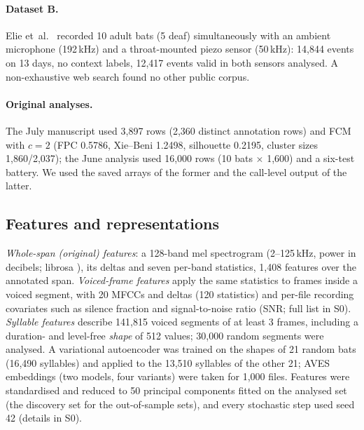 \paragraph{Dataset B.} Elie et~al.\ \cite{elie2024} recorded 10 adult bats (5 deaf) simultaneously with an ambient microphone (192\,kHz) and a throat-mounted piezo sensor (50\,kHz): 14,844 events on 13 days, no context labels, 12,417 events valid in both sensors analysed. A non-exhaustive web search found no other public corpus.

\paragraph{Original analyses.} The July manuscript used 3,897 rows (2,360 distinct annotation rows) and FCM with $c=2$ (FPC 0.5786, Xie--Beni 1.2498, silhouette 0.2195, cluster sizes 1,860/2,037); the June analysis used 16,000 rows (10 bats $\times$ 1,600) and a six-test battery. We used the saved arrays of the former and the call-level output of the latter.

\subsection{Features and representations}
\emph{Whole-span (original) features}: a 128-band mel spectrogram (2--125\,kHz, power in decibels; librosa \cite{mcfee2015}), its deltas and seven per-band statistics, 1,408 features over the annotated span. \emph{Voiced-frame features} apply the same statistics to frames inside a voiced segment, with 20 MFCCs and deltas (120 statistics) and per-file recording covariates such as silence fraction and signal-to-noise ratio (SNR; full list in S0). \emph{Syllable features} describe 141,815 voiced segments of at least 3 frames, including a duration- and level-free \emph{shape} of 512 values; 30,000 random segments were analysed. A variational autoencoder \cite{goffinet2021} was trained on the shapes of 21 random bats (16,490 syllables) and applied to the 13,510 syllables of the other 21; AVES embeddings \cite{aves2023} (two models, four variants) were taken for 1,000 files. Features were standardised and reduced to 50 principal components fitted on the analysed set (the discovery set for the out-of-sample sets), and every stochastic step used seed 42 (details in S0).

